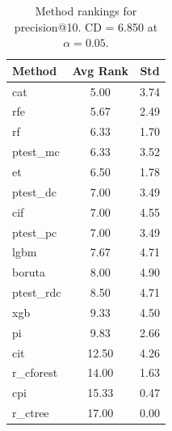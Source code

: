 \begin{table}[h]
\centering
\caption{Method rankings for precision@10. CD = 6.850 at $\alpha=0.05$.}
\label{tab:ranks_precision@10}
\begin{tabular}{lcc}
\toprule
Method & Avg Rank & Std \\
\midrule
cat & 5.00 & 3.74 \\
rfe & 5.67 & 2.49 \\
rf & 6.33 & 1.70 \\
ptest_mc & 6.33 & 3.52 \\
et & 6.50 & 1.78 \\
ptest_dc & 7.00 & 3.49 \\
cif & 7.00 & 4.55 \\
ptest_pc & 7.00 & 3.49 \\
lgbm & 7.67 & 4.71 \\
boruta & 8.00 & 4.90 \\
ptest_rdc & 8.50 & 4.71 \\
xgb & 9.33 & 4.50 \\
pi & 9.83 & 2.66 \\
cit & 12.50 & 4.26 \\
r_cforest & 14.00 & 1.63 \\
cpi & 15.33 & 0.47 \\
r_ctree & 17.00 & 0.00 \\
\bottomrule
\end{tabular}
\end{table}